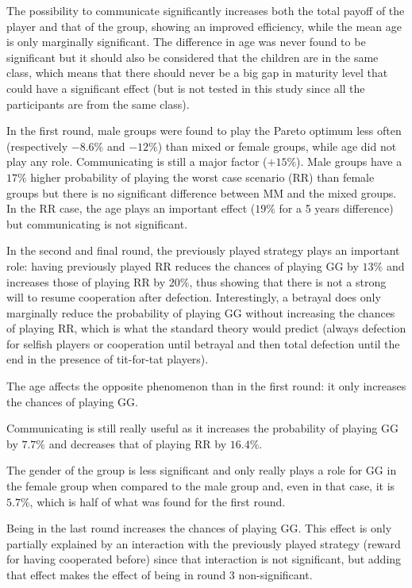 \documentclass{article} %
\begin{document}
The possibility to communicate significantly increases both the total payoff of the player and that of the group, showing an improved efficiency, while the mean age is only marginally significant. The difference in age was never found to be significant but it should also be considered that the children are in the same class, which means that there should never be a big gap in maturity level that could have a significant effect (but is not tested in this study since all the participants are from the same class). 

In the first round, male groups were found to play the Pareto optimum less often (respectively $-8.6\%$ and $-12\%$) than mixed or female groups, while age did not play any role. Communicating is still a major factor ($+15\%$).
Male groups have a $17\%$ higher probability of playing the worst case scenario (RR) than female groups but there is no significant difference between MM and the mixed groups. In the RR case, the age plays an important effect ($19\%$ for a 5 years difference) but communicating is not significant.

In the second and final round, the previously played strategy plays an important role: having previously played RR reduces the chances of playing GG by $13\%$ and increases those of playing RR by $20\%$, thus showing that there is not a strong will to resume cooperation after defection. Interestingly, a betrayal does only marginally reduce the probability of playing GG without increasing the chances of playing RR, which is what the standard theory would predict (always defection for selfish players or cooperation until betrayal and then total defection until the end in the presence of tit-for-tat players).

The age affects the opposite phenomenon than in the first round: it only increases the chances of playing GG. 

Communicating is still really useful as it increases the probability of playing GG by $7.7\%$ and decreases that of playing RR by $16.4\%$.

The gender of the group is less significant and only really plays a role for GG in the female group when compared to the male group and, even in that case, it is $5.7\%$, which is half of what was found for the first round.

Being in the last round increases the chances of playing GG. This effect is only partially explained by an interaction with the previously played strategy (reward for having cooperated before) since that interaction is not significant, but adding that effect makes the effect of being in round 3 non-significant.
\end{document}
